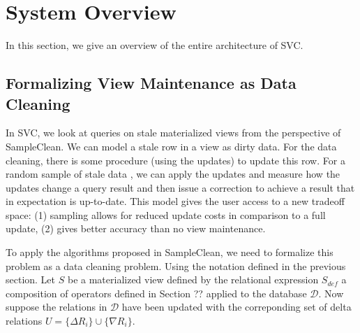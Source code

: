 \section{System Overview}\label{sec-arch}
In this section, we give an overview of the entire architecture of SVC. 


\subsection{Formalizing View Maintenance as Data Cleaning}

In SVC, we look at queries on stale materialized views from the perspective of SampleClean.
We can model a stale row in a view as dirty data. 
For the data cleaning, there is some procedure (using the updates) to update this row. 
For a random sample of stale data , we can apply the updates and measure how the updates change a query result and then issue a correction to achieve a result that in expectation is up-to-date. 
This model gives the user access to a new tradeoff space: (1) sampling allows for reduced update costs in comparison to a full update, (2) gives better accuracy than no view maintenance.   


To apply the algorithms  proposed in SampleClean, we need to formalize this problem as a data cleaning problem.
Using the notation defined in the previous section. 
Let $S$ be a materialized view defined by the relational expression $S_{def}$ a composition of operators defined in Section ?? applied to the database $\mathcal{D}$.
Now suppose the relations in $\mathcal{D}$ have been updated with the correponding set of delta relations $U = \{\Delta R_i\} \cup \{\nabla R_i\}$. 

